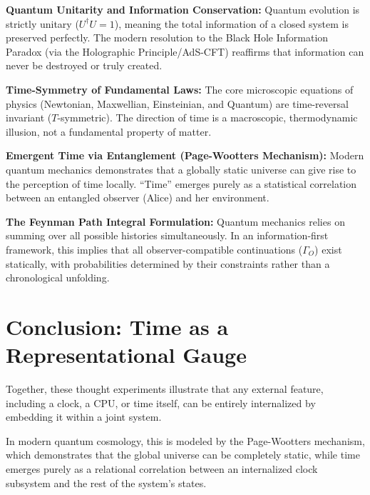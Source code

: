 \textbf{Quantum Unitarity and Information Conservation:} Quantum evolution is strictly unitary ($U^\dagger U = 1$), meaning the total information of a closed system is preserved perfectly. The modern resolution to the Black Hole Information Paradox (via the Holographic Principle/AdS-CFT) reaffirms that information can never be destroyed or truly created.

\textbf{Time-Symmetry of Fundamental Laws:} The core microscopic equations of physics (Newtonian, Maxwellian, Einsteinian, and Quantum) are time-reversal invariant ($T$-symmetric). The direction of time is a macroscopic, thermodynamic illusion, not a fundamental property of matter.

\textbf{Emergent Time via Entanglement (Page-Wootters Mechanism):} Modern quantum mechanics demonstrates that a globally static universe can give rise to the perception of time locally. ``Time'' emerges purely as a statistical correlation between an entangled observer (Alice) and her environment.

\textbf{The Feynman Path Integral Formulation:} Quantum mechanics relies on summing over all possible histories simultaneously. In an information-first framework, this implies that all observer-compatible continuations ($\Gamma_O$) exist statically, with probabilities determined by their constraints rather than a chronological unfolding.



\section{Conclusion: Time as a Representational Gauge}

Together, these thought experiments illustrate that any external feature, including a clock, a CPU, or time itself, can be entirely internalized by embedding it within a joint system.

In modern quantum cosmology, this is modeled by the Page-Wootters mechanism, which demonstrates that the global universe can be completely static, while time 
emerges purely as a relational correlation between an internalized clock subsystem and the rest of the system's states. 

